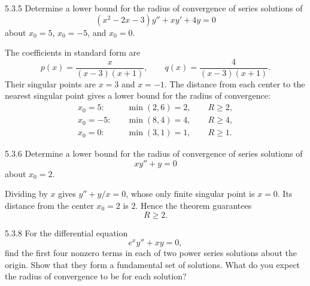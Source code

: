 \documentclass[11pt,oneside]{article}
\begin{document}
\begin{problem}{5.3.5}
Determine a lower bound for the radius of convergence of series solutions of
\[
    (x^2-2x-3)y''+xy'+4y=0
\]
about $x_0=5$, $x_0=-5$, and $x_0=0$.
\end{problem}

\begin{solution}
The coefficients in standard form are
\[
    p(x)=\frac{x}{(x-3)(x+1)}, \qquad
    q(x)=\frac{4}{(x-3)(x+1)}.
\]
Their singular points are $x=3$ and $x=-1$. The distance from each center to the nearest singular point gives a lower bound for the radius of convergence:
\[
    \begin{aligned}
      x_0=5:&\quad \min(2, 6)=2, \qquad \boxed{R\geq2},\\
      x_0=-5:&\quad \min(8, 4)=4, \qquad \boxed{R\geq4},\\
      x_0=0:&\quad \min(3, 1)=1, \qquad \boxed{R\geq1}.
    \end{aligned}
\]
\end{solution}

\begin{problem}{5.3.6}
Determine a lower bound for the radius of convergence of series solutions of
\[
    xy''+y=0
\]
about $x_0=2$.
\end{problem}

\begin{solution}
Dividing by $x$ gives $y''+y/x=0$, whose only finite singular point is $x=0$. Its distance from the center $x_0=2$ is $2$. Hence the theorem guarantees
\[
    \boxed{R\geq2}.
\]
\end{solution}

\begin{problem}{5.3.8}
For the differential equation
\[
    e^xy''+xy=0,
\]
find the first four nonzero terms in each of two power series solutions about the origin. Show that they form a fundamental set of solutions. What do you expect the radius of convergence to be for each solution?
\end{problem}
\end{document}
